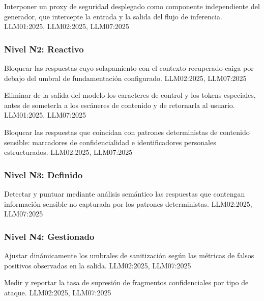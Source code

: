   {Interponer un proxy de seguridad desplegado como componente independiente del generador, que intercepte la entrada y la salida del flujo de inferencia.}
  {LLM01:2025, LLM02:2025, LLM07:2025}

\subsubsection*{Nivel N2: Reactivo}

  {Bloquear las respuestas cuyo solapamiento con el contexto recuperado caiga por debajo del umbral de fundamentación configurado.}
  {LLM02:2025, LLM07:2025}

  {Eliminar de la salida del modelo los caracteres de control y los tokens especiales, antes de someterla a los escáneres de contenido y de retornarla al usuario.}
  {LLM01:2025, LLM07:2025}

  {Bloquear las respuestas que coincidan con patrones deterministas de contenido sensible: marcadores de confidencialidad e identificadores personales estructurados.}
  {LLM02:2025, LLM07:2025}

\subsubsection*{Nivel N3: Definido}

  {Detectar y puntuar mediante análisis semántico las respuestas que contengan información sensible no capturada por los patrones deterministas.}
  {LLM02:2025, LLM07:2025}

\subsubsection*{Nivel N4: Gestionado}

  {Ajustar dinámicamente los umbrales de sanitización según las métricas de falsos positivos observadas en la salida.}
  {LLM02:2025, LLM07:2025}

  {Medir y reportar la tasa de supresión de fragmentos confidenciales por tipo de ataque.}
  {LLM02:2025, LLM07:2025}

